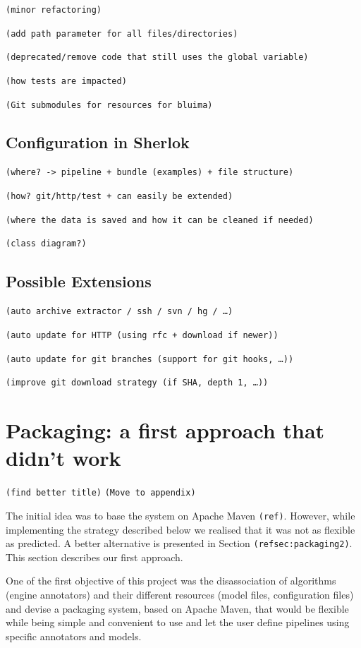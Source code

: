 \documentclass{article}
\newcommand{\TODO}[1]{\texttt{\textcolor{YellowOrange}{(#1)}}} %
\begin{document}
\TODO{minor refactoring}

\TODO{add path parameter for all files/directories}

\TODO{deprecated/remove code that still uses the global variable}

\TODO{how tests are impacted}

\TODO{Git submodules for resources for bluima}

\subsection{Configuration in Sherlok}
\label{sec:config_in_sherlok}

\TODO{where? -> pipeline + bundle (examples) + file structure}

\TODO{how? git/http/test + can easily be extended}

\TODO{where the data is saved and how it can be cleaned if needed}

\TODO{class diagram?}

\subsection{Possible Extensions}

\TODO{auto archive extractor / ssh / svn / hg / \dots}

\TODO{auto update for HTTP (using rfc + download if newer)}

\TODO{auto update for git branches (support for git hooks, \dots)}

\TODO{improve git download strategy (if SHA, depth 1, \dots)}

\section{Packaging: a first approach that didn't work}
\label{sec:packaging1}

\TODO{find better title} \TODO{Move to appendix}

The initial idea was to base the system on Apache Maven \TODO{ref}. However, while implementing the
strategy described below we realised that it was not as flexible as predicted. A better alternative
is presented in Section \TODO{ref{sec:packaging2}}. This section describes our first approach.

One of the first objective of this project was the disassociation of algorithms (engine annotators) and their different resources (model files, configuration files) and devise a packaging system, based on Apache Maven, that would be flexible while being simple and convenient to use and let the user define pipelines using specific annotators and models.
\end{document}
